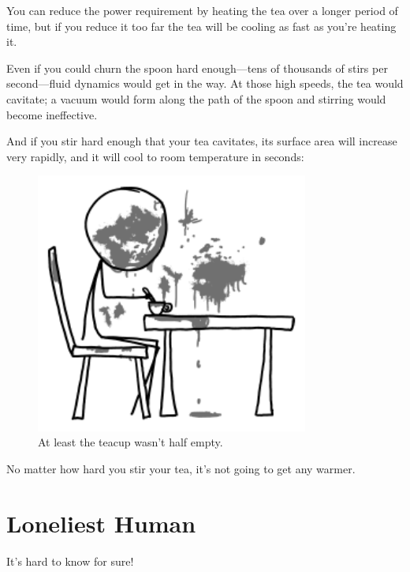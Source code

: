 {{You can reduce the power requirement by heating the tea over a longer period of time, but if you reduce it too far the tea will be cooling as fast as you're heating it.}

{Even if you could churn the spoon hard enough—tens of thousands of stirs per second—fluid dynamics would get in the way. At those high speeds, the tea would cavitate; a vacuum would form along the path of the spoon and stirring would become ineffective.}

{And if you stir hard enough that your tea cavitates, its surface area will increase very rapidly, and it will cool to room temperature in seconds:}

\begin{figure}[!htbp]
\centering
\includegraphics[scale=0.5, max width=0.8\textwidth]{imgs/a/71/tea_stir.png}
\caption{At least the teacup wasn't half empty.}
\end{figure}

{No matter how hard you stir your tea, it's not going to get any warmer.}

{
\chapter{Loneliest Human}
}

\hfill{}

{It's hard to know for sure!}

}
